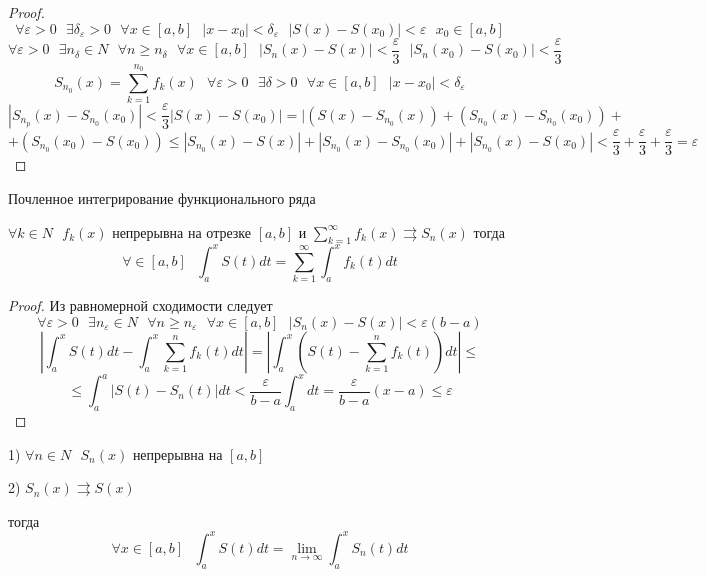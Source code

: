 \begin{proof}
  $$
  \forall \varepsilon > 0 ~~~ \exists \delta_{\varepsilon} > 0 ~~~
  \forall x \in [a,b] ~~~ |x - x_0| < \delta_{\varepsilon} ~~~
  |S(x) - S(x_0)| < \varepsilon ~~~ x_0 \in [a,b]
  $$
  $$
  \forall \varepsilon > 0 ~~~ \exists n_{\delta} \in N ~~~ \forall n \ge
  n_{\delta} ~~~ \forall x \in [a,b] ~~~ |S_n(x) - S(x)| <
  \frac{\varepsilon}{3} ~~~ |S_n(x_0) - S(x_0)| < \frac{\varepsilon}{3}
  $$
  $$
  S_{n_0}(x) = \sum_{k=1}^{n_0} f_k(x) ~~~ \forall \varepsilon > 0 ~~~
  \exists \delta > 0 ~~~ \forall x \in [a,b] ~~~ |x - x_0| <
  \delta_{\varepsilon}
  $$
  $$
  |S_{n_p}(x) - S_{n_0}(x_0)| < \frac{\varepsilon}{3}
  |S(x) - S(x_0)| =  |(S(x) - S_{n_0}(x)) + (S_{n_0}(x) - S_{n_0}(x_0)) +
  $$
  $$
  + (S_{n_0}(x_0) - S(x_0)) \le |S_{n_0}(x) - S(x)| +
  |S_{n_0}(x) - S_{n_0}(x_0)| + |S_{n_0}(x) - S(x_0)| < \frac{\varepsilon}{3} +
  \frac{\varepsilon}{3} + \frac{\varepsilon}{3} = \varepsilon
  $$
\end{proof}

\begin{title}
  Почленное интегрирование функционального ряда
\end{title}

\begin{theorem}
  $\forall k \in N ~~~ f_k(x)$ непрерывна на отрезке $[a,b]$ и
  $\sum_{k=1}^{\infty} f_k(x) \rightrightarrows S_n(x)$ тогда
  $$
  \forall \in [a,b] ~~~ \int_a^x S(t)dt =
  \sum_{k=1}^{\infty} \int_a^x f_k(t)dt
  $$
\end{theorem}

\begin{proof}
  Из равномерной сходимости следует
  $$
  \forall \varepsilon  > 0 ~~~ \exists n_{\varepsilon} \in N ~~~
  \forall n \ge n_{\varepsilon} ~~~ \forall x \in[a,b] ~~~
  |S_n(x) - S(x)| < \varepsilon (b-a)
  $$
  $$
  \left| \int_a^x S(t)dt - \int_a^x \sum_{k=1}^n f_k(t)dt \right| =
  \left| \int_a^x (S(t) - \sum_{k=1}^n f_k(t))dt \right| \le
  $$
  $$
  \le \int_a^a |S(t) - S_n(t)|dt < \frac{\varepsilon}{b-a} \int_a^x dt =
  \frac{\varepsilon}{b-a}(x-a) \le \varepsilon
  $$
\end{proof}

\begin{theorem}
  1) $\forall n \in N ~~~ S_n(x)$ непрерывна на $[a,b]$

  2) $S_n(x) \rightrightarrows S(x)$

  тогда
  $$
  \forall x \in [a,b] ~~~ \int_a^x S(t)dt = \lim_{n \to \infty}
  \int_a^x S_n(t)dt
  $$
\end{theorem}


